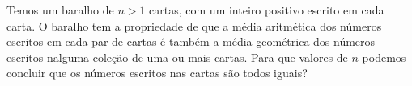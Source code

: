 Temos um baralho de $n > 1$ cartas, com um inteiro positivo escrito em cada carta.
O baralho tem a propriedade de que a média aritmética dos números escritos em cada par de cartas é também a média geométrica dos números escritos nalguma coleção de uma ou mais cartas.
Para que valores de $n$ podemos concluir que os números escritos nas cartas são todos iguais?
